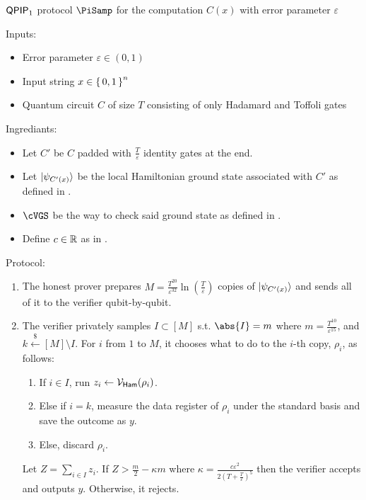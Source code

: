 \begin{protocol}{$\operatorname{\mathsf{QPIP}}_1$ protocol $\PiSamp$ for the computation $C(x)$ with error parameter $\varepsilon$}
	\label{ProtoQPIP1}

	Inputs:
	\begin{itemize}
		\item Error parameter $\varepsilon\in(0, 1)$
		\item Input string $x\in\set{0, 1}^n$
		\item Quantum circuit $C$ of size $T$ consisting of only Hadamard and Toffoli gates 
	\end{itemize}

	Ingrediants:
	\begin{itemize}
		\item Let $C'$ be $C$ padded with $\frac{T}{\varepsilon}$ identity gates at the end.
		\item Let $\ket{\psi_{C'(x)}}$ be the local Hamiltonian ground state associated with $C'$ as defined in . 
		\item $\cVGS$ be the way to check said ground state as defined in . 
		\item Define $c\in\mathbb{R}$ as in . 
	\end{itemize}

	Protocol:
	\begin{enumerate}
		\item The honest prover prepares $M=\frac{T^{20}}{\varepsilon^{32}}\ln(\frac{T}{\varepsilon})$ copies of $\ket{\psi_{C'(x)}}$ and sends all of it to the verifier qubit-by-qubit.
		\item The verifier privately samples $I\subset[M]$ s.t. $\abs{I}=m$ where $m=\frac{T^{10}}{\varepsilon^{15}}$, and $k\xleftarrow{\$}[M]\setminus I$.
			For $i$ from $1$ to $M$, it chooses what to do to the $i$-th copy, $\rho_i$, as follows:
		\begin{enumerate}
			\item If $i\in I$, run $z_i\leftarrow\mathcal{V}_{\mathsf{Ham}}(\rho_i)$.
			\item Else if $i=k$, measure the data register  of $\rho_i$ under the standard basis and save the outcome as $y$.
			\item Else, discard $\rho_i$.
		\end{enumerate}
			Let $Z=\sum_{i\in I} z_i$. If $Z>\frac{m}{2}-\kappa m$ where $\kappa=\frac{c\varepsilon^2}{2\left(T+\frac{T}{\varepsilon}\right)^5}$ then the verifier accepts and outputs $y$. Otherwise, it rejects.
	\end{enumerate}
\end{protocol}

